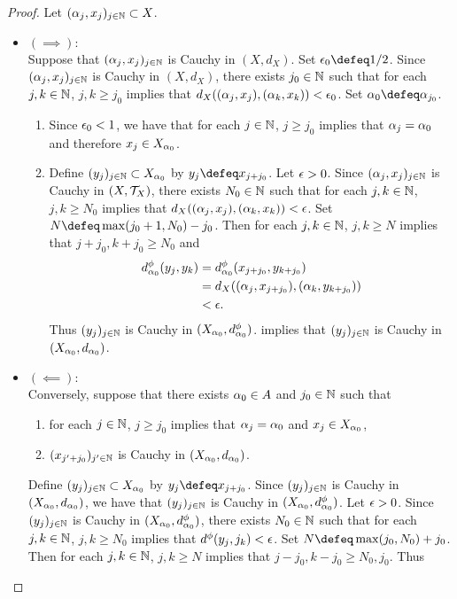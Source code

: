 \documentclass{book}
\begin{document}
\begin{proof} Let $(\alpha_j, x_j)_{j \in \mathbb{N}} \subset X$. 
	\begin{itemize}
		\item $(\implies):$ \\
		Suppose that $(\alpha_j, x_j)_{j \in \mathbb{N}}$ is Cauchy in $(X, d_X)$. Set $\ep_0 \defeq 1/2$. Since $(\alpha_j, x_j)_{j \in \mathbb{N}}$ is Cauchy in $(X, d_X)$, there exists $j_0 \in \mathbb{N}$ such that for each $j,k \in \mathbb{N}$, $j,k \geq j_0$ implies that $d_X((\alpha_j, x_j), (\alpha_k, x_k)) < \epsilon_0$. Set $\al_0 \defeq \al_{j_0}$. 
		\begin{enumerate}
			\item Since $\epsilon_0 < 1$, we have that for each $j \in \mathbb{N}$, $j \geq j_0$ implies that $\alpha_j = \alpha_0$ and therefore $x_j \in X_{\alpha_0}$.
			\item Define $(y_j)_{j \in \mathbb{N}} \subset X_{\alpha_0}$ by $y_j \defeq x_{j + j_0}$. Let $\epsilon > 0$. Since $(\alpha_j, x_j)_{j \in \mathbb{N}}$ is Cauchy in $(X, \mathcal{T}_X)$, there exists $N_0 \in \mathbb{N}$ such that for each $j,k \in \mathbb{N}$, $j,k \geq N_0$ implies that $d_X((\alpha_j, x_j), (\alpha_k, x_k)) < \epsilon$. Set $N \defeq \max(j_0 + 1, N_0) - j_0$. Then for each $j,k \in \mathbb{N}$, $j,k \geq N$ implies that $j + j_0, k+j_0 \geq N_0$ and 
			\begin{align*}
				d^{\phi}_{\alpha_0}(y_j, y_k)
				& = d^{\phi}_{\alpha_0}(x_{j+j_0}, y_{k+j_0}) \\
				& = d_X((\alpha_j, x_{j+j_0}), (\alpha_k, y_{k+j_0})) \\
				& < \epsilon .
			\end{align*}
			Thus $(y_j)_{j \in \mathbb{N}}$ is Cauchy in $(X_{\alpha_0}, d^{\phi}_{\alpha_0})$.   implies that $(y_j)_{j \in \mathbb{N}}$ is Cauchy in $(X_{\alpha_0}, d_{\alpha_0})$.  
		\end{enumerate}
		\item $(\impliedby):$ \\
		Conversely, suppose that there exists $\alpha_0 \in A$ and $j_0 \in \mathbb{N}$ such that 
		\begin{enumerate}
			\item for each $j \in \mathbb{N}$, $j \geq j_0$ implies that $\alpha_j = \alpha_0$ and $x_j \in X_{\alpha_0}$,
			\item $(x_{j'+j_0})_{j' \in \mathbb{N}}$ is Cauchy in $(X_{\alpha_0}, d_{\alpha_0})$. 
		\end{enumerate}
		Define $(y_j)_{j \in \mathbb{N}} \subset X_{\alpha_0}$ by $y_j \defeq x_{j + j_0}$. Since $(y_j)_{j \in \mathbb{N}}$ is Cauchy in $(X_{\alpha_0}, d_{\alpha_0})$, we have that $(y_j)_{j \in \mathbb{N}}$ is Cauchy in $(X_{\alpha_0}, d^{\phi}_{\alpha_0})$. Let $\epsilon > 0$. Since $(y_j)_{j \in \mathbb{N}}$ is Cauchy in $(X_{\alpha_0}, d^{\phi}_{\alpha_0})$, there exists $N_0 \in \mathbb{N}$ such that for each $j,k \in \mathbb{N}$, $j,k \geq N_0$ implies that $d^{\phi}(y_j, j_k) < \epsilon$. Set $N \defeq \max(j_0, N_0) + j_0$. Then for each $j,k \in \mathbb{N}$, $j,k \geq N$ implies that $j-j_0, k-j_0 \geq N_0, j_0$. Thus 

\end{itemize}
\end{proof}
\end{document}
